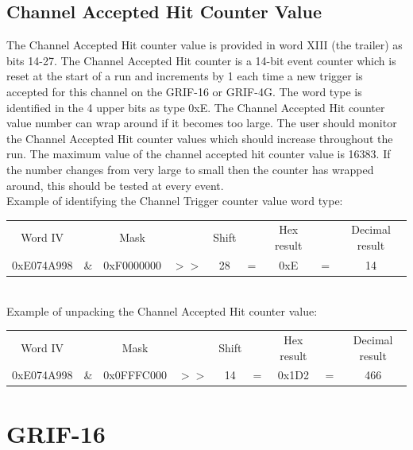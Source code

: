 \documentclass[letterpaper,12pt,notitlepage]{report}
\begin{document}
\subsection{Channel Accepted Hit Counter Value}
The Channel Accepted Hit counter value is provided in word XIII (the trailer) as bits 14-27. The Channel Accepted Hit counter is a 14-bit event counter which is reset at the start of a run and increments by 1 each time a new trigger is accepted for this channel on the GRIF-16 or GRIF-4G. The word type is identified in the 4 upper bits as type 0xE. The Channel Accepted Hit counter value number can wrap around if it becomes too large. The user should monitor the Channel Accepted Hit counter values which should increase throughout the run. The maximum value of the channel accepted hit counter value is 16383. If the number changes from very large to small then the counter has wrapped around, this should be tested at every event.\\

Example of identifying the Channel Trigger counter value word type:\\

\begin{tabular}{ccccccccc}
Word IV &  & Mask & & Shift & & Hex result & & Decimal result\\
0xE074A998 & \& & 0xF0000000 & $>>$ & 28 & = & 0xE & = & 14\\
\end{tabular}\\

Example of unpacking the Channel Accepted Hit counter value:\\

\begin{tabular}{ccccccccc}
Word IV &  & Mask & & Shift & & Hex result & & Decimal result\\
0xE074A998 & \& & 0x0FFFC000 & $>>$ & 14 & = & 0x1D2 & = & 466\\
\end{tabular}

\section{GRIF-16}
\end{document}
